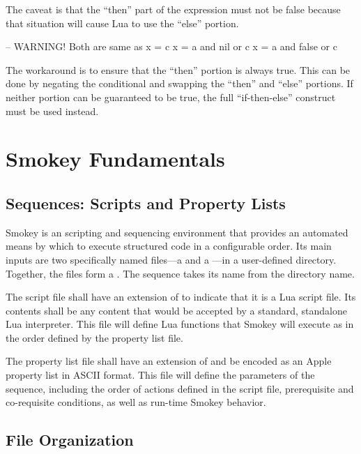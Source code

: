 The caveat is that the ``then'' part of the expression must not be false
because that situation will cause Lua to use the ``else'' portion.

\begin{LuaCode}
-- WARNING!  Both are same as x = c
x = a and nil or c
x = a and false or c
\end{LuaCode}

The workaround is to ensure that the ``then'' portion is always true.  This can
be done by negating the conditional and swapping the ``then'' and ``else''
portions.  If neither portion can be guaranteed to be true, the full
``if-then-else'' construct must be used instead.


\section{Smokey Fundamentals}
\label{sec:Fundamentals}

\subsection{Sequences: Scripts and Property Lists}

Smokey is an scripting and sequencing environment that provides an automated
means by which to execute structured code in a configurable order.  Its main
inputs are two specifically named files---a  and a
---in a user-defined directory.  Together, the files
form a .  The sequence takes its name from the directory name.

The script file shall have an extension of  to indicate that it
is a Lua script file.  Its contents shall be any content that would be
accepted by a standard, standalone Lua interpreter.  This file will define Lua
functions that Smokey will execute as  in the order defined by
the property list file.

The property list file shall have an extension of  and be
encoded as an Apple property list in ASCII format.  This file will define the
parameters of the sequence, including the order of actions defined in the
script file, prerequisite and co-requisite conditions, as well as run-time
Smokey behavior.

\subsection{File Organization}
\label{sec:FileOrg}

